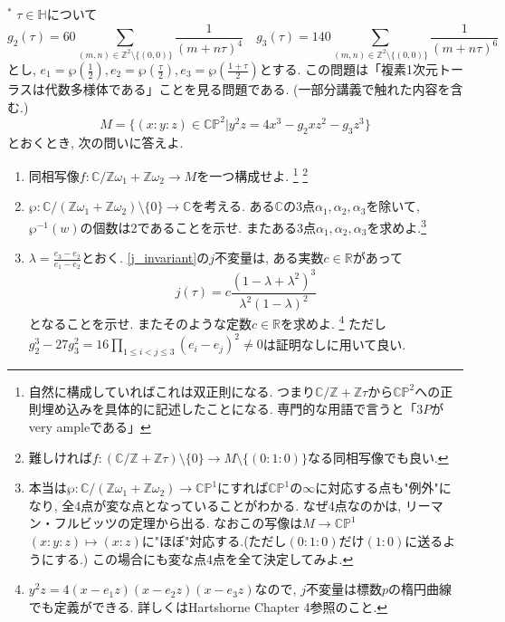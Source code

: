 \documentclass[dvipdfmx,a4paper,11pt]{article}
\newcommand{\R}{\mathbb{R}}
\newcommand{\Z}{\mathbb{Z}}
\newcommand{\C}{\mathbb{C}}
\theoremstyle{definition}
\begin{document}
 \item $^{*}$ \label{embedding} $\tau \in \mathbb{H}$について
$$ g_2(\tau) = 60\sum_{(m,n) \in \Z^2 \setminus \{ (0,0)\} }\frac{1}{(m+ n \tau)^4}
\quad
 g_3(\tau)=140 \sum_{(m,n) \in \Z^2 \setminus \{ (0,0)\} }\frac{1}{(m+ n \tau)^6} 
 $$とし, $e_1 = \wp(\frac{1}{2}), e_2 = \wp(\frac{\tau}{2}), e_3 = \wp( \frac{1+\tau}{2})$とする.
 この問題は「複素1次元トーラスは代数多様体である」ことを見る問題である. (一部分講義で触れた内容を含む.)
 $$M = \{ (x:y:z) \in \C \mathbb{P}^2 | y^2z = 4x^3 - g_2 x z^2- g_3 z^3 \}$$とおくとき, 次の問いに答えよ. 
 \begin{enumerate}
\item  同相写像$f: \C/\Z  \omega_1 + \Z \omega_2 \rightarrow  M$を一つ構成せよ.
\footnote{自然に構成していればこれは双正則になる. つまり$\C/\Z+ \Z \tau $から$\C \mathbb{P}^2$への正則埋め込みを具体的に記述したことになる. 専門的な用語で言うと「$3P$がvery ampleである」}
\footnote{難しければ$f: (\C/\Z  + \Z \tau) \setminus \{ 0\} \rightarrow  M \setminus \{ (0 : 1: 0)\}$なる同相写像でも良い.}
\item $\wp : \C/(\Z  \omega_1 + \Z \omega_2) \setminus  \{ 0\}\rightarrow \C $を考える. ある$\C$の3点$\alpha_1,\alpha_2,\alpha_3$を除いて, $\wp^{-1}(w)$の個数は2であることを示せ. またある3点$\alpha_1,\alpha_2,\alpha_3$を求めよ.\footnote{本当は$\wp : \C/(\Z  \omega_1 + \Z \omega_2) \to \C\mathbb{P}^1$にすれば$\C\mathbb{P}^1$の$\infty$に対応する点も"例外"になり, 全4点が変な点となっていることがわかる. なぜ4点なのかは, リーマン・フルビッツの定理から出る. なおこの写像は$M \to \C\mathbb{P}^1$ $(x:y:z) \mapsto (x:z)$に"ほぼ"対応する.(ただし$(0:1:0)$だけ$(1:0)$に送るようにする.) この場合にも変な点4点を全て決定してみよ.} 
\item $\lambda = \frac{e_3 - e_2}{e_1 - e_2}$とおく. \ref{j_invariant}の$j$不変量は, ある実数$c \in \R$があって
$$
j(\tau ) = c \frac{(1 - \lambda + \lambda^2)^3}{\lambda^2 (1 - \lambda)^2}
$$
となることを示せ. またそのような定数$c \in \R$を求めよ. \footnote{$y^2 z = 4(x - e_1 z)(x - e_2 z) (x - e_3 z)$なので, $j$不変量は標数$p$の楕円曲線でも定義ができる. 詳しくはHartshorne Chapter 4参照のこと. }
ただし$g_{2}^{3} - 27 g_{3}^{2} = 16\prod_{1 \le i< j \le 3}(e_i - e_j)^2 \neq 0$は証明なしに用いて良い.
 \end{enumerate}
 
\end{document}
